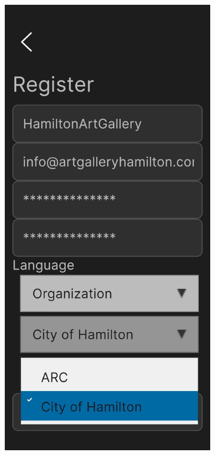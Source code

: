 \documentclass[12pt, titlepage]{article}
\begin{document}
\newpage
\begin{figure}[ht!]
    \centering
    \begin{subfigure}[b]{0.48\textwidth}
        \centering
        \includegraphics[width=\textwidth]{register4.png}

\end{subfigure}
\end{figure}
\end{document}
